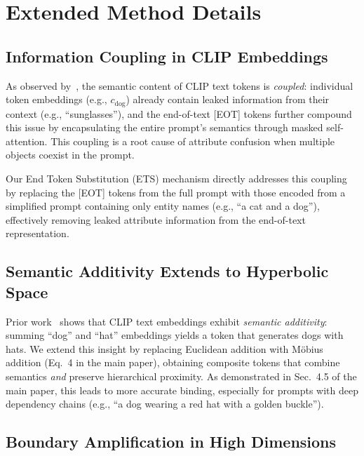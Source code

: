 \documentclass[sigconf,nonacm]{acmart}
\begin{document}
\section{Extended Method Details}
\label{sec:extended_method}

\subsection{Information Coupling in CLIP Embeddings}

As observed by~\cite{hu2024tome}, the semantic content of CLIP text tokens is \emph{coupled}: individual token embeddings (e.g., $c_{\text{dog}}$) already contain leaked information from their context (e.g., ``sunglasses''), and the end-of-text [EOT] tokens further compound this issue by encapsulating the entire prompt's semantics through masked self-attention. This coupling is a root cause of attribute confusion when multiple objects coexist in the prompt.

Our End Token Substitution (ETS) mechanism directly addresses this coupling by replacing the [EOT] tokens from the full prompt with those encoded from a simplified prompt containing only entity names (e.g., ``a cat and a dog''), effectively removing leaked attribute information from the end-of-text representation.

\subsection{Semantic Additivity Extends to Hyperbolic Space}

Prior work~\cite{hu2024tome} shows that CLIP text embeddings exhibit \emph{semantic additivity}: summing ``dog'' and ``hat'' embeddings yields a token that generates dogs with hats. We extend this insight by replacing Euclidean addition with M\"obius addition (Eq.~4 in the main paper), obtaining composite tokens that combine semantics \emph{and} preserve hierarchical proximity. As demonstrated in Sec.~4.5 of the main paper, this leads to more accurate binding, especially for prompts with deep dependency chains (e.g., ``a dog wearing a red hat with a golden buckle'').

\subsection{Boundary Amplification in High Dimensions}
\end{document}
